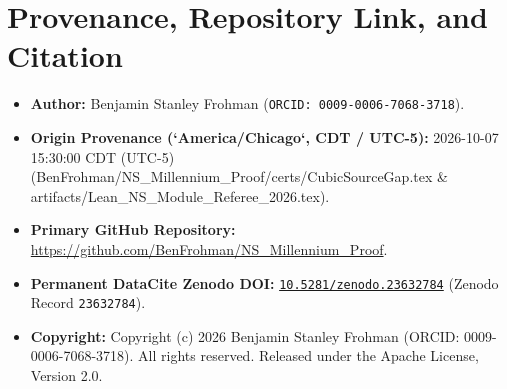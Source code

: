 \documentclass[11pt,letterpaper]{article}
\begin{document}
\section*{Provenance, Repository Link, and Citation}
\begin{itemize}[leftmargin=2em]
  \item \textbf{Author:} Benjamin Stanley Frohman (\texttt{ORCID: 0009-0006-7068-3718}).
  \item \textbf{Origin Provenance (`America/Chicago`, CDT / UTC-5):} 2026-10-07 15:30:00 CDT (UTC-5) (BenFrohman/NS\_Millennium\_Proof/certs/CubicSourceGap.tex \& artifacts/Lean\_NS\_Module\_Referee\_2026.tex).
  \item \textbf{Primary GitHub Repository:} \url{https://github.com/BenFrohman/NS_Millennium_Proof}.
  \item \textbf{Permanent DataCite Zenodo DOI:} \href{https://doi.org/10.5281/zenodo.23632784}{\texttt{10.5281/zenodo.23632784}} (Zenodo Record \texttt{23632784}).
  \item \textbf{Copyright:} Copyright (c) 2026 Benjamin Stanley Frohman (ORCID: 0009-0006-7068-3718). All rights reserved. Released under the Apache License, Version 2.0.
\end{itemize}
\end{document}
